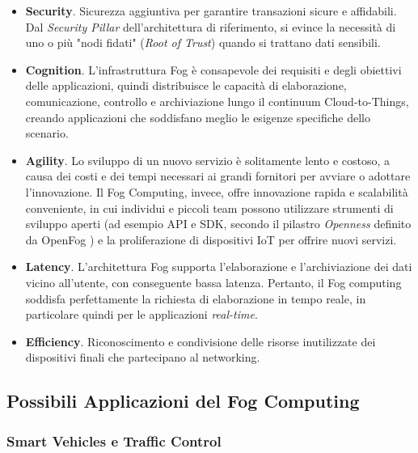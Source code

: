 \begin{itemize}
	\item \textbf{Security}. Sicurezza aggiuntiva per garantire transazioni sicure e affidabili. Dal \textit{Security Pillar} dell'architettura di riferimento, si evince la necessità di uno o più "nodi fidati" (\textit{Root of Trust}) quando si trattano dati sensibili.
	\item \textbf{Cognition}. L'infrastruttura Fog è consapevole dei requisiti e degli obiettivi delle applicazioni, quindi distribuisce le capacità di elaborazione, comunicazione, controllo e archiviazione lungo il continuum Cloud-to-Things, creando applicazioni che soddisfano meglio le esigenze specifiche dello scenario.
	\item \textbf{Agility}. Lo sviluppo di un nuovo servizio è solitamente lento e costoso, a causa dei costi e dei tempi necessari ai grandi fornitori per avviare o adottare l'innovazione. Il Fog Computing, invece, offre innovazione rapida e scalabilità conveniente, in cui individui e piccoli team possono utilizzare strumenti di sviluppo aperti (ad esempio API e SDK, secondo il pilastro \textit{Openness} definito da OpenFog \cite{OpenFogReferenceArchitecture}) e la proliferazione di dispositivi IoT per offrire nuovi servizi.
	\item \textbf{Latency}. L'architettura Fog supporta l'elaborazione e l'archiviazione dei dati vicino all'utente, con conseguente bassa latenza. Pertanto, il Fog computing soddisfa perfettamente la richiesta di elaborazione in tempo reale, in particolare quindi per le applicazioni \textit{real-time}.
	\item \textbf{Efficiency}. Riconoscimento e condivisione delle risorse inutilizzate dei dispositivi finali che partecipano al networking.
\end{itemize}

\subsection{Possibili Applicazioni del Fog Computing}

\subsubsection{Smart Vehicles e Traffic Control}

